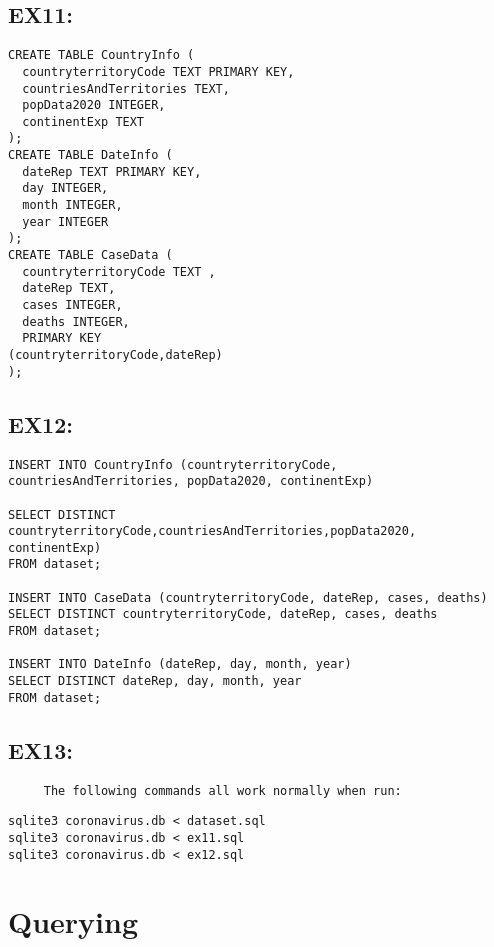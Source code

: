 \documentclass{article}
\begin{document}
\subsection{EX11:} 


\begin{verbatim}
CREATE TABLE CountryInfo (
  countryterritoryCode TEXT PRIMARY KEY,
  countriesAndTerritories TEXT,
  popData2020 INTEGER,
  continentExp TEXT
); 
CREATE TABLE DateInfo (
  dateRep TEXT PRIMARY KEY,
  day INTEGER,
  month INTEGER,
  year INTEGER
);
CREATE TABLE CaseData (
  countryterritoryCode TEXT ,
  dateRep TEXT,
  cases INTEGER,
  deaths INTEGER,
  PRIMARY KEY
(countryterritoryCode,dateRep)
);
\end{verbatim}

\newpage

\subsection{EX12:}


\begin{verbatim}
INSERT INTO CountryInfo (countryterritoryCode, countriesAndTerritories, popData2020, continentExp)

SELECT DISTINCT countryterritoryCode,countriesAndTerritories,popData2020, continentExp)
FROM dataset;

INSERT INTO CaseData (countryterritoryCode, dateRep, cases, deaths)
SELECT DISTINCT countryterritoryCode, dateRep, cases, deaths
FROM dataset;

INSERT INTO DateInfo (dateRep, day, month, year)
SELECT DISTINCT dateRep, day, month, year
FROM dataset;
\end{verbatim}
\subsection{EX13:}

\begin{lstlisting}
     The following commands all work normally when run:
\end{lstlisting}
   

\begin{verbatim}
sqlite3 coronavirus.db < dataset.sql
sqlite3 coronavirus.db < ex11.sql
sqlite3 coronavirus.db < ex12.sql
\end{verbatim}


\section{Querying}
\end{document}
